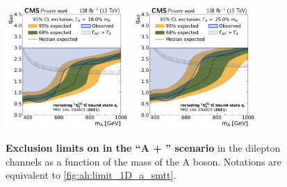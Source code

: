 \begin{figure}[!ph]
    \\
    \includegraphics[width=0.42\textwidth]{figures/ah/limits_etat_w2p8/A_limit_w18p0_g-scan.pdf}%
    \hspace*{0.05\textwidth}%
    \includegraphics[width=0.42\textwidth]{figures/ah/limits_etat_w2p8/A_limit_w25p0_g-scan.pdf}
    \caption{%
        \textbf{Exclusion limits on \gAtt in the ``A + \etat'' scenario} in the dilepton channels as a function of the mass of the A boson. Notations are equivalent to \cref{fig:ah:limit_1D_a_smtt}.
    }
    \label{fig:ah:limit_1D_a_etat}
\end{figure}
    
